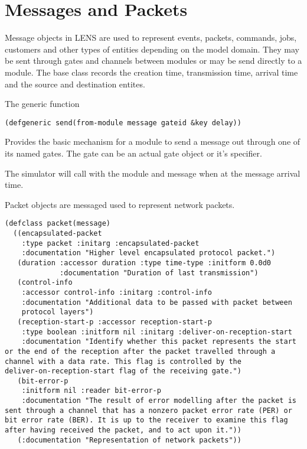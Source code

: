\documentclass[a4paper,11pt,twoside,openany]{report}
\newcommand{\acr}[1]{\acrshort{#1}}
\begin{document}
\chapter{Messages and Packets}

Message objects in \acr{LENS} are used to represent events, packets,
commands, jobs, customers and other types of entities depending on the
model domain. They may be sent through gates and channels between
modules or may be send directly to a module. The base 
class records the creation time, transmission time, arrival time and
the source and destination entites.

The generic function
\begin{lstlisting}
(defgeneric send(from-module message gateid &key delay))
\end{lstlisting}
Provides the basic mechanism for a module to send a message out
through one of its named gates. The gate can be an actual gate object
or it's specifier.

The simulator will call  with the module and
message when at the message arrival time.

Packet objects are messaged used to represent network packets.

\begin{lstlisting}
(defclass packet(message)
  ((encapsulated-packet
    :type packet :initarg :encapsulated-packet
    :documentation "Higher level encapsulated protocol packet.")
   (duration :accessor duration :type time-type :initform 0.0d0
             :documentation "Duration of last transmission")
   (control-info
    :accessor control-info :initarg :control-info
    :documentation "Additional data to be passed with packet between
    protocol layers")
   (reception-start-p :accessor reception-start-p
    :type boolean :initform nil :initarg :deliver-on-reception-start
    :documentation "Identify whether this packet represents the start
or the end of the reception after the packet travelled through a
channel with a data rate. This flag is controlled by the
deliver-on-reception-start flag of the receiving gate.")
   (bit-error-p
    :initform nil :reader bit-error-p
    :documentation "The result of error modelling after the packet is
sent through a channel that has a nonzero packet error rate (PER) or
bit error rate (BER). It is up to the receiver to examine this flag
after having received the packet, and to act upon it."))
   (:documentation "Representation of network packets"))
\end{lstlisting}
\end{document}
